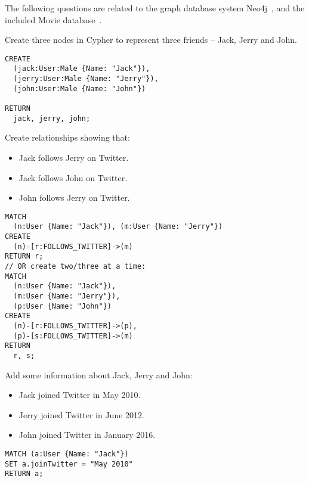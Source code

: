 

\noindent
The following questions are related to the graph database system Neo4j~\cite{neo4j}, and the included Movie database~\cite{moviedb}.

\begin{questions}

\question
Create three nodes in Cypher to represent three friends -- Jack, Jerry and John.
\begin{solution}
  \begin{verbatim}
CREATE
  (jack:User:Male {Name: "Jack"}), 
  (jerry:User:Male {Name: "Jerry"}),
  (john:User:Male {Name: "John"})

RETURN
  jack, jerry, john;
  \end{verbatim}
\end{solution}
  
\question
Create relationships showing that:

\begin{itemize}
  \item Jack follows Jerry on Twitter.
  \item Jack follows John on Twitter.
  \item John follows Jerry on Twitter.
\end{itemize}

\begin{solution}
  \begin{verbatim}
MATCH
  (n:User {Name: "Jack"}), (m:User {Name: "Jerry"})
CREATE
  (n)-[r:FOLLOWS_TWITTER]->(m)
RETURN r;
// OR create two/three at a time:
MATCH 
  (n:User {Name: "Jack"}),
  (m:User {Name: "Jerry"}),
  (p:User {Name: "John"})
CREATE
  (n)-[r:FOLLOWS_TWITTER]->(p),
  (p)-[s:FOLLOWS_TWITTER]->(m)
RETURN
  r, s;
  \end{verbatim}
\end{solution}

\question
Add some information about Jack, Jerry and John:
\begin{itemize}
  \item Jack joined Twitter in May 2010.
  \item Jerry joined Twitter in June 2012.
  \item John joined Twitter in January 2016.
\end{itemize}

\begin{solution}
\begin{verbatim}
MATCH (a:User {Name: "Jack"})
SET a.joinTwitter = "May 2010"
RETURN a;


\end{verbatim}
\end{solution}
\end{questions}
